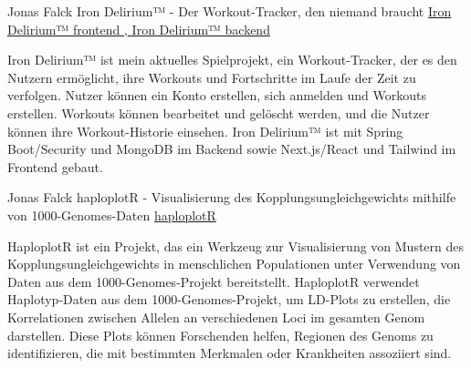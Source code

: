 

\begin{cventries}
\cventry
  {Jonas Falck}
  { Iron Delirium™ - Der Workout-Tracker, den niemand braucht } %
  {
\href{ https://github.com/joe-nas/workout-app-frontend-next }{ Iron Delirium™ frontend },\href{ https://github.com/joe-nas/workout-app }{ Iron Delirium™ backend }}
  {} %
  {    
  \begin{cvitems} %
    \item { Iron Delirium™ ist mein aktuelles Spielprojekt, ein Workout-Tracker, der es den Nutzern ermöglicht, ihre Workouts und Fortschritte im Laufe der Zeit zu verfolgen. Nutzer können ein Konto erstellen, sich anmelden und Workouts erstellen. Workouts können bearbeitet und gelöscht werden, und die Nutzer können ihre Workout-Historie einsehen. Iron Delirium™ ist mit Spring Boot/Security und MongoDB im Backend sowie Next.js/React und Tailwind im Frontend gebaut. }
  \end{cvitems}
  }
\cventry
  {Jonas Falck}
  { haploplotR - Visualisierung des Kopplungsungleichgewichts mithilfe von 1000-Genomes-Daten } %
  {
\href{ https://github.com/joe-nas/haploplotR }{ haploplotR }}
  {} %
  {    
  \begin{cvitems} %
    \item { HaploplotR ist ein Projekt, das ein Werkzeug zur Visualisierung von Mustern des Kopplungsungleichgewichts in menschlichen Populationen unter Verwendung von Daten aus dem 1000-Genomes-Projekt bereitstellt. HaploplotR verwendet Haplotyp-Daten aus dem 1000-Genomes-Projekt, um LD-Plots zu erstellen, die Korrelationen zwischen Allelen an verschiedenen Loci im gesamten Genom darstellen. Diese Plots können Forschenden helfen, Regionen des Genoms zu identifizieren, die mit bestimmten Merkmalen oder Krankheiten assoziiert sind. }
  \end{cvitems}
  }
\end{cventries}